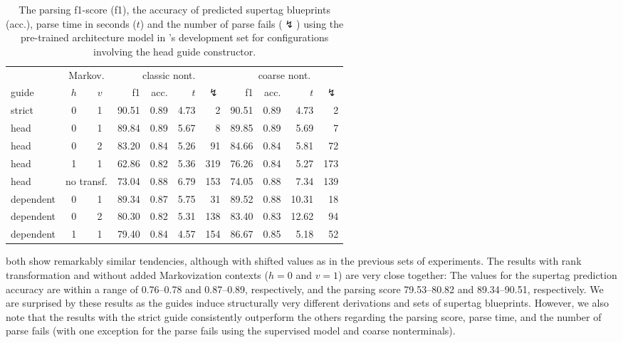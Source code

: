 \documentclass[../../document.tex]{subfiles}
\begin{document}
    \begin{table}
        \caption{\label{tbl:gridsearch:head:3}
        The parsing f1-score (f1), the accuracy of predicted supertag blueprints (acc.), parse time in seconds ($t$) and the number of parse fails ($\lightning$) using the pre-trained architecture model in \negra{}'s development set for configurations involving the head guide constructor.
        }
        \centering
        \vspace{.2cm}
        \begin{tabular}{lcc|rrrr|rrrr}
            \toprule
                    & \multicolumn{2}{c|}{Markov.} & \multicolumn{4}{c|}{classic nont.} &  \multicolumn{4}{c}{coarse nont.} \\
                    guide           & \(h\) & \(v\) & f1 & acc. & $t$ & $\lightning$ & f1 & acc. & $t$ & $\lightning$  \\ \hline \rowcolor{black!10}
strict & 0 & 1                         & 90.51 & 0.89 & 4.73 &   2 & 90.51 & 0.89 &  4.73 &   2 \\\hline
head & 0 & 1                           & 89.84 & 0.89 & 5.67 &   8 & 89.85 & 0.89 &  5.69 &   7 \\
head & 0 & 2                           & 83.20 & 0.84 & 5.26 &  91 & 84.66 & 0.84 &  5.81 &  72 \\
head & 1 & 1                           & 62.86 & 0.82 & 5.36 & 319 & 76.26 & 0.84 &  5.27 & 173 \\
head & \multicolumn{2}{c|}{no transf.} & 73.04 & 0.88 & 6.79 & 153 & 74.05 & 0.88 &  7.34 & 139 \\\hline
dependent & 0 & 1                      & 89.34 & 0.87 & 5.75 &  31 & 89.52 & 0.88 & 10.31 &  18 \\
dependent & 0 & 2                      & 80.30 & 0.82 & 5.31 & 138 & 83.40 & 0.83 & 12.62 &  94 \\
dependent & 1 & 1                      & 79.40 & 0.84 & 4.57 & 154 & 86.67 & 0.85 &  5.18 &  52 \\
\hline
\bottomrule
        \end{tabular}
    \end{table}

     both show remarkably similar tendencies, although with shifted values as in the previous sets of experiments.
    The results with rank transformation and without added Markovization contexts ($h=0$ and $v=1$) are very close together:
        The values for the supertag prediction accuracy are within a range of 0.76--0.78 and 0.87--0.89, respectively, and the parsing score 79.53--80.82 and 89.34--90.51, respectively.
    We are surprised by these results as the guides induce structurally very different derivations and sets of supertag blueprints.
    However, we also note that the results with the strict guide consistently outperform the others regarding the parsing score, parse time, and the number of parse fails (with one exception for the parse fails using the supervised model and coarse nonterminals).
\end{document}
